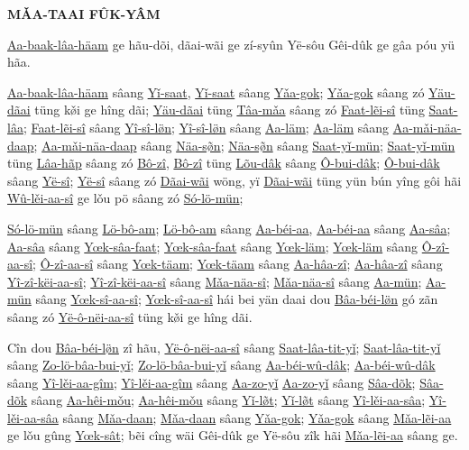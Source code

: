 \documentclass[twoside,twocolumn,a4paper,10pt]{memoir}
\begin{document}
	
	
	\vskip 36pt
	\begin{center} \large \textbf{M\v{A}A-TAAI FÛK-YÂM} \normalsize \end{center}
	\begin{scripture}
		\noindent
		\underline{Aa-baak-lâa-häam} ge hãu-dõi, dãai-wãi ge zí-syûn Yë-sôu Gêi-dûk ge gâa póu yü hãa.
		
		\underline{Aa-baak-lâa-häam} sâang \underline{Y\v{i}-saat}, \underline{Y\v{i}-saat} sâang \underline{Y\v{a}a-gok}; \underline{Y\v{a}a-gok} sâang zó \underline{Yäu-dãai} tüng k\v{ø}i ge hîng dãi; \underline{Yäu-dãai} tüng \underline{Tâa-m\v{a}a} sâang zó \underline{Faat-lẽi-sî} tüng \underline{Saat-lâa}; \underline{Faat-lẽi-sî} sâang \underline{Yî-sî-lø̈n}; \underline{Yî-sî-lø̈n} sâang \underline{Aa-läm};
		\underline{Aa-läm} sâang \underline{Aa-m\v{a}i-näa-daap}; \underline{Aa-m\v{a}i-näa-daap} sâang \underline{Näa-sø̃n}; \underline{Näa-sø̃n} sâang \underline{Saat-y\v{i}-mün};
		\underline{Saat-y\v{i}-mün} tüng \underline{Lâa-hãp} sâang zó \underline{Bô-zî}, \underline{Bô-zî} tüng \underline{Lõu-dâk} sâang \underline{Ô-bui-dâk}; \underline{Ô-bui-dâk} sâang \underline{Yë-sî};
		\underline{Yë-sî} sâang zó \underline{Dãai-wãi} wöng, yï \underline{Dãai-wãi} tüng yün bún yîng gôi hãi \underline{Wû-l\v{e}i-aa-sî} ge l\v{o}u pö sâang zó \underline{Só-lö-mün};
		
		\underline{Só-lö-mün} sâang \underline{Lö-bô-am}; \underline{Lö-bô-am} sâang \underline{Aa-béi-aa}, \underline{Aa-béi-aa} sâang \underline{Aa-sâa};
		\underline{Aa-sâa} sâang \underline{Yœk-sâa-faat}; \underline{Yœk-sâa-faat} sâang \underline{Yœk-läm}; \underline{Yœk-läm} sâang \underline{Ô-zî-aa-sî};
		\underline{Ô-zî-aa-sî} sâang \underline{Yœk-täam}; \underline{Yœk-täam} sâang \underline{Aa-hâa-zî}; \underline{Aa-hâa-zî} sâang \underline{Yî-zî-këi-aa-sî};
		\underline{Yî-zî-këi-aa-sî} sâang \underline{M\v{a}a-näa-sî}; \underline{M\v{a}a-näa-sî} sâang \underline{Aa-mün}; \underline{Aa-mün} sâang \underline{Yœk-sî-aa-sî};
		\underline{Yœk-sî-aa-sî} hái bei yän daai dou \underline{Bâa-béi-lø̈n} gó zãn sâang zó \underline{Yë-ô-nëi-aa-sî} tüng k\v{\o{}}i ge hîng dãi.
		
		Cîn dou \underline{Bâa-béi-lø̈n} zî hãu, \underline{Yë-ô-nëi-aa-sî} sâang \underline{Saat-lâa-tit-y\v{i}}; \underline{Saat-lâa-tit-y\v{i}} sâang \underline{Zo-lö-bâa-bui-y\v{i}};
		\underline{Zo-lö-bâa-bui-y\v{i}} sâang \underline{Aa-béi-wû-dâk}; \underline{Aa-béi-wû-dâk} sâang \underline{Yî-l\v{e}i-aa-gîm}; \underline{Yî-l\v{e}i-aa-gîm} sâang \underline{Aa-zo-y\v{i}}
		\underline{Aa-zo-y\v{i}} sâang \underline{Sâa-dõk}; \underline{Sâa-dõk} sâang \underline{Aa-hêi-m\v{o}u}; \underline{Aa-hêi-m\v{o}u} sâang \underline{Y\v{i}-l\~{\o{}}t};
		\underline{Y\v{i}-l\~{\o{}}t} sâang \underline{Yî-l\v{e}i-aa-sâa}; \underline{Yî-l\v{e}i-aa-sâa} sâang \underline{M\v{a}a-daan}; \underline{M\v{a}a-daan} sâang \underline{Y\v{a}a-gok};
		\underline{Y\v{a}a-gok} sâang \underline{M\v{a}a-lẽi-aa} ge l\v{o}u gûng \underline{Yœk-sât}; bẽi cîng wäi Gêi-dûk ge Yë-sôu zîk hãi \underline{M\v{a}a-lẽi-aa} sâang ge.
		

\end{scripture}
\end{document}

